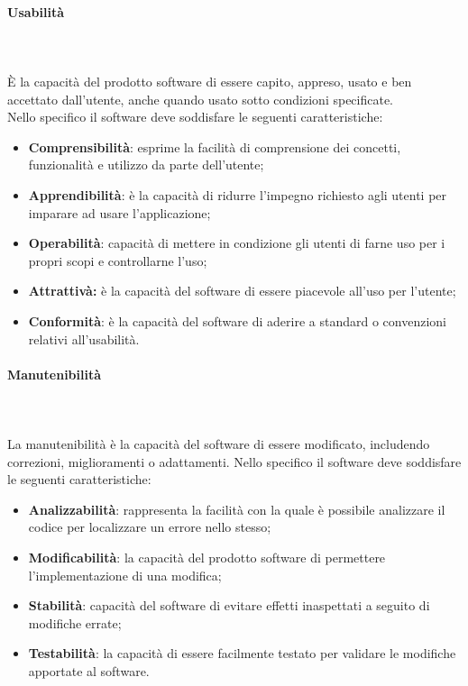 \paragraph{Usabilità}\mbox{} \\ \mbox{} \\
È la capacità del prodotto software di essere capito, appreso, usato e ben accettato dall'utente, anche quando usato sotto condizioni specificate. \\
Nello specifico il software deve soddisfare le seguenti caratteristiche:
\begin{itemize}
	\item \textbf{Comprensibilità}: esprime la facilità di comprensione dei concetti, funzionalità e utilizzo da parte dell'utente;
	\item \textbf{Apprendibilità}: è la capacità di ridurre l'impegno richiesto agli utenti per imparare ad usare l'applicazione;
	\item \textbf{Operabilità}: capacità di mettere in condizione gli utenti di farne uso per i propri scopi e controllarne l'uso;
	\item \textbf{Attrattivà:} è la capacità del software di essere piacevole all'uso per l'utente;
	\item \textbf{Conformità}: è la capacità del software di aderire a standard o convenzioni relativi all'usabilità.

\end{itemize}
\paragraph{Manutenibilità}\mbox{} \\ \mbox{} \\
La manutenibilità è la capacità del software di essere modificato, includendo correzioni, miglioramenti o adattamenti.
Nello specifico il software deve soddisfare le seguenti caratteristiche:
\begin{itemize}
	\item \textbf{Analizzabilità}: rappresenta la facilità con la quale è possibile analizzare il codice per localizzare un errore nello stesso;
	\item \textbf{Modificabilità}: la capacità del prodotto software di permettere l'implementazione di una modifica;
	\item \textbf{Stabilità}: capacità del software di evitare effetti inaspettati a seguito di modifiche errate;
	\item \textbf{Testabilità}: la capacità di essere facilmente testato per validare le modifiche apportate al software.
\end{itemize}

